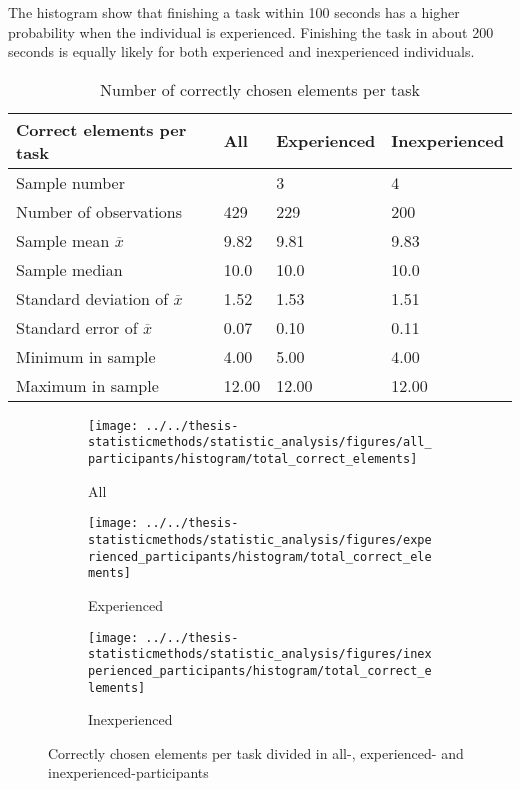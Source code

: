 The histogram show that finishing a task within 100 seconds has a higher probability when the individual is experienced. Finishing the task in about 200 seconds is equally likely for both experienced and inexperienced individuals. 

\begin{table}[H]
	\centering
	\begin{tabular}{l|l|l|l}
		Correct elements per task  & All  & Experienced & Inexperienced \\ \hline
		Sample number &   & 3  & 4   \\
		Number of observations & 429    & 229  & 200   \\
		Sample mean $\overline{x}$   & 9.82 & 9.81  & 9.83  \\
		Sample median & 10.0 & 10.0 & 10.0 \\
		Standard deviation of $\overline{x}$   & 1.52  & 1.53  &  1.51 \\
		Standard error of $\overline{x}$   & 0.07  & 0.10 &  0.11 \\
		Minimum in sample & 4.00 & 5.00  &  4.00  \\
		Maximum in sample  & 12.00 & 12.00  & 12.00  \\ \hline
	\end{tabular}
	\caption[Correct elements, all participants and all tasks]{Number of correctly chosen elements per task}
	\label{tab:totalcorrect_all}
\end{table}

\begin{figure}[H]
	\centering
	\begin{subfigure}[b]{0.32\textwidth}
		\centering
		\texttt{[image: ../../thesis-statisticmethods/statistic\_analysis/figures/all\_participants/histogram/total\_correct\_elements]}
		\caption{All}
		\label{fig:totalcorrectelements_all}
	\end{subfigure}
	\begin{subfigure}[b]{0.32\textwidth}
		\centering
		\texttt{[image: ../../thesis-statisticmethods/statistic\_analysis/figures/experienced\_participants/histogram/total\_correct\_elements]}
		\caption{Experienced}
		\label{fig:totalcorrectelements_experienced}
	\end{subfigure}
	\begin{subfigure}[b]{0.32\textwidth}
		\centering
		\texttt{[image: ../../thesis-statisticmethods/statistic\_analysis/figures/inexperienced\_participants/histogram/total\_correct\_elements]}
		\caption{Inexperienced}
		\label{fig:totalcorrectelements_inexperienced}
	\end{subfigure}
	\caption[Correct elements, participants sorted]{Correctly chosen elements per task divided in  all-, experienced- and inexperienced-participants}
\end{figure}

